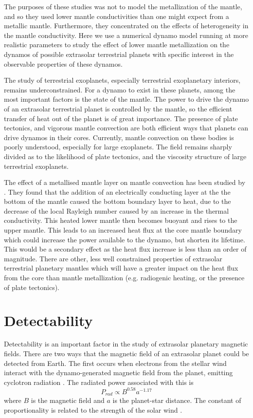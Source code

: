 The purposes of these studies was not to model the metallization of the mantle, and so they used lower mantle conductivities than one might expect from a metallic mantle. Furthermore, they concentrated on the effects of heterogeneity in the mantle conductivity. Here we use a numerical dynamo model running at more realistic parameters to study the effect of lower mantle metallization on the dynamos of possible extrasolar terrestrial planets with specific interest in the observable properties of these dynamos.

The study of terrestrial exoplanets, especially terrestrial exoplanetary interiors, remains underconstrained. For a dynamo to exist in these planets, among the most important factors is the state of the mantle. The power  to drive the dynamo of an extrasolar terrestrial planet is controlled by the mantle, so the efficient transfer of heat out of the planet is of great importance. The presence of plate tectonics, and vigorous mantle convection are both efficient ways that planets can drive dynamos in their cores. Currently, mantle convection on these bodies is poorly understood, especially for large exoplanets. The field remains sharply divided \citep{lenardic2012, oneill2007, stein2011, stein2013, valencia2009, vanheck2011} as to the likelihood of plate tectonics, and the viscosity structure \citep{karato2011} of large terrestrial exoplanets. 

The effect of a metallised mantle layer on mantle convection has been studied by \citep{vandenberg2010}. They found that the addition of an electrically conducting layer at the the bottom of the mantle caused the bottom boundary layer to heat, due to the decrease of the local Rayleigh number caused by an increase in the thermal conductivity. This heated lower mantle then becomes buoyant and rises to the upper mantle. This leads to an increased heat flux at the core mantle boundary which could increase the power available to the dynamo, but shorten its lifetime. This would be a secondary effect as the heat flux increase is less than an order of magnitude. There are other, less well constrained properties of extrasolar terrestrial planetary mantles which will have a greater impact on the heat flux from the core than mantle metallization (e.g. radiogenic heating, or the presence of plate tectonics). 

\section{Detectability}
Detectability is an important factor in the study of extrasolar planetary magnetic fields. There are two ways that the magnetic field of an extrasolar planet could be detected from Earth. The first occurs when electrons from the stellar wind interact with the dynamo-generated magnetic field from the planet, emitting cyclotron radiation \citep{farrell1999, griessmeier2007, lecacheux1991}. The radiated power associated with this is 
\begin{equation}
P_{rad}\propto B^{0.58} a^{-1.17}
\end{equation}
where $B$ is the magnetic field and $a$ is the planet-star distance. The constant of proportionality is related to the strength of the solar wind \citep{farrell1999}.

